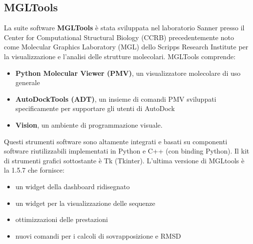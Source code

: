 \subsection{MGLTools}
La suite software \textbf{MGLTools} è stata sviluppata nel laboratorio Sanner presso il Center for Computational Structural Biology (CCRB) precedentemente noto come Molecular Graphics Laboratory (MGL) dello Scripps Research Institute per la visualizzazione e l'analisi delle strutture molecolari. MGLTools comprende:

\begin{itemize}
    \item \textbf{Python Molecular Viewer (PMV)}, un visualizzatore molecolare di uso generale
    \item \textbf{AutoDockTools (ADT)}, un insieme di comandi PMV sviluppati specificamente per supportare gli utenti di AutoDock
    \item \textbf{Vision}, un ambiente di programmazione visuale.
\end{itemize}

Questi strumenti software sono altamente integrati e basati su componenti software riutilizzabili implementati in Python e C++ (con binding Python). Il kit di strumenti grafici sottostante è Tk (Tkinter). L'ultima versione di MGLtools è la 1.5.7 che fornisce:

\begin{itemize}
    \item un widget della dashboard ridisegnato
    \item un widget per la visualizzazione delle sequenze
    \item ottimizzazioni delle prestazioni
    \item nuovi comandi per i calcoli di sovrapposizione e RMSD
\end{itemize}

